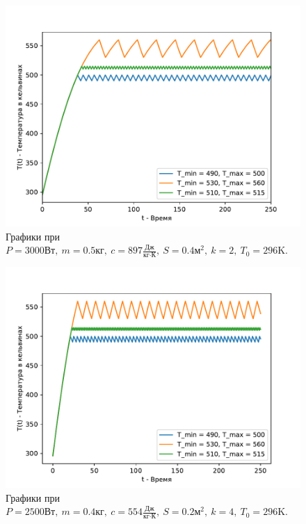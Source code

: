         \begin{figure}[H]
            \centering
            \includegraphics[width=12cm]{pictures/utug2.pdf}
            \caption{Графики при $P = 3000 \text{Вт}, ~ m = 0.5 \text{кг}, ~ c = 897 \frac{\text{Дж}}{\text{кг} \cdot \text{К}}, ~ S = 0.4 \text{м}^2, ~ k = 2, ~ T_0 = 296 \text{K}$.}
        \end{figure}


        \begin{figure}[H]
            \centering
            \includegraphics[width=12cm]{pictures/utug3.pdf}
            \caption{Графики при $P = 2500 \text{Вт}, ~ m = 0.4 \text{кг}, ~ c = 554 \frac{\text{Дж}}{\text{кг} \cdot \text{К}}, ~ S = 0.2 \text{м}^2, ~ k = 4, ~ T_0 = 296 \text{K}$.}
        \end{figure}


